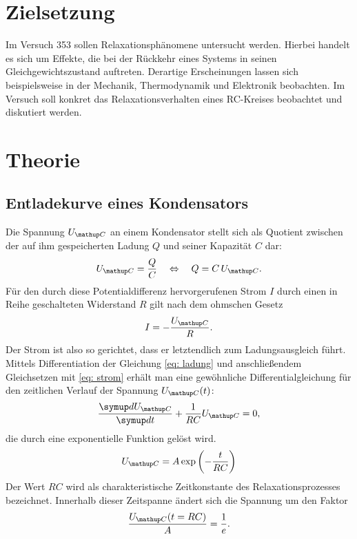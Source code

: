 \setcounter{page}{1}
\section*{Zielsetzung}
Im Versuch 353 sollen Relaxationsphänomene untersucht werden. Hierbei handelt es sich um Effekte, die bei der Rückkehr eines
Systems in seinen Gleichgewichtszustand auftreten. Derartige Erscheinungen lassen sich beispielsweise in der Mechanik, Thermodynamik
und Elektronik beobachten. Im Versuch soll konkret das Relaxationsverhalten eines RC-Kreises beobachtet und diskutiert werden.
\section{Theorie}
\subsection{Entladekurve eines Kondensators}
Die Spannung $U\ua{C}$ an einem Kondensator stellt sich als Quotient zwischen der auf ihm gespeicherten Ladung $Q$ und seiner Kapazität $C$ dar:
\begin{equation}
  U\ua{C} = \frac{Q}{C} \quad \Leftrightarrow \quad Q = C\, U\ua{C}.
  \label{eq: ladung}
\end{equation}
Für den durch diese Potentialdifferenz hervorgerufenen Strom $I$ durch einen in Reihe geschalteten Widerstand $R$ gilt nach dem ohmschen Gesetz
\begin{equation}
  I = -\frac{U\ua{C}}{R}.
  \label{eq: strom}
\end{equation}
Der Strom ist also so gerichtet, dass er letztendlich zum Ladungsausgleich führt. Mittels Differentiation der Gleichung \eqref{eq: ladung} und anschließendem
Gleichsetzen mit \eqref{eq: strom} erhält
man eine gewöhnliche Differentialgleichung für den zeitlichen Verlauf der Spannung $U\ua{C}(t)$:
\begin{equation}
  \frac{\dif{U\ua{C}}}{\dif{t}} + \frac{1}{RC}U\ua{C} = 0,
\end{equation}
die durch eine exponentielle Funktion gelöst wird.
\begin{equation}
  \label{eq:entlade_kurve}
  U\ua{C} = A \exp\left(-\frac{t}{RC}\right)
\end{equation}
Der Wert $RC$ wird als charakteristische Zeitkonstante des Relaxationsprozesses bezeichnet. Innerhalb dieser Zeitspanne ändert %
sich die Spannung um den Faktor
\begin{equation}
  \frac{U\ua{C}(t = RC)}{A} = \frac{1}{e}.
\end{equation}
